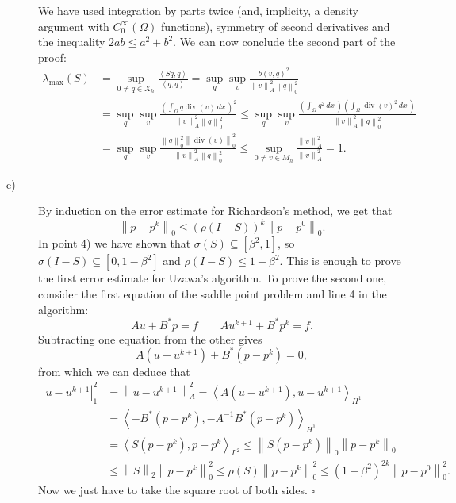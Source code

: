 \documentclass[a4paper]{article}
\DeclareMathOperator{\diver}{div}
\newcommand{\dx}{\, dx \,}
\newcommand{\seminorm}[1]{\left\lvert #1 \right\rvert}
\newcommand{\norm}[1]{\left\lVert #1 \right\rVert}
\newcommand{\dpair}[1]{\left\langle #1 \right\rangle}
\begin{document}
\begin{description}
	We have used integration by parts twice (and, implicity, a density argument
	with $C_0^\infty(\Omega)$ functions), symmetry of second derivatives and the
	inequality $2ab \leq a^2 + b^2$. We can now conclude the second part of the proof:
	\begin{align*}
	\lambda_\text{max}(S)
&	= \sup_{0 \neq q \in X_h} \frac{\dpair{Sq,q}}{\dpair{q,q}}
	= \sup_{q} \sup_{v} \frac{b(v,q)^2}{\norm{v}_A^2 \norm{q}_0^2} \\
&	= \sup_{q} \sup_{v} \frac{
		\left( \int_\Omega q \diver(v) \dx \right)^2
		}{\norm{v}_A^2 \norm{q}_0^2}
	\leq \sup_{q} \sup_{v} \frac{
		\left( \int_\Omega q^2 \dx \right)
		\left( \int_\Omega \diver(v)^2 \dx \right)
		}{\norm{v}_A^2 \norm{q}_0^2} \\
&	= \sup_{q} \sup_{v} \frac{\norm{q}_0^2 \norm{\diver(v)}_0^2}
		{\norm{v}_A^2 \norm{q}_0^2}
	\leq \sup_{0 \neq v \in M_h} \frac{\norm{v}_A^2}{\norm{v}_A^2}
	= 1.
	\end{align*}
\item[e)] By induction on the error estimate for Richardson's method, we get that
	\[
	\norm{p-p^k}_0 \leq (\rho(I-S))^k \norm{p-p^0}_0.
	\]
	In point 4) we have shown that $\sigma(S) \subseteq [\beta^2,1]$,
	so $\sigma(I-S) \subseteq [0,1-\beta^2]$ and $\rho(I-S) \leq 1 - \beta^2$.
	This is enough to prove the first error estimate for Uzawa's algorithm.
	To prove the second one, consider the first equation of the saddle point problem
	and line 4 in the algorithm:
	\[
	Au + B^*p = f \qquad Au^{k+1} + B^*p^k = f.
	\]
	Subtracting one equation from the other gives
	\[
	A(u-u^{k+1})+B^\ast(p-p^k)=0,
	\]
	from which we can deduce that
	\begin{align*}
	\seminorm{u-u^{k+1}}_1^2
&	= \norm{u-u^{k+1}}_A^2
	= \dpair{A(u-u^{k+1}),u-u^{k+1}}_{H^1} \\
&	= \dpair{-B^*(p-p^k),-A^{-1}B^*(p-p^k)}_{H^1} \\
&	= \dpair{S(p-p^k),p-p^k}_{L^2}
	\leq \norm{S(p-p^k)}_0 \norm{p-p^k}_0 \\
&	\leq \norm{S}_2 \norm{p-p^k}_0^2
	\leq \rho(S) \norm{p-p^k}_0^2
	\leq (1-\beta^2)^{2k} \norm{p-p^0}_0^2.
	\end{align*}
	Now we just have to take the square root of both sides. $\square$
\end{description}
\end{document}
